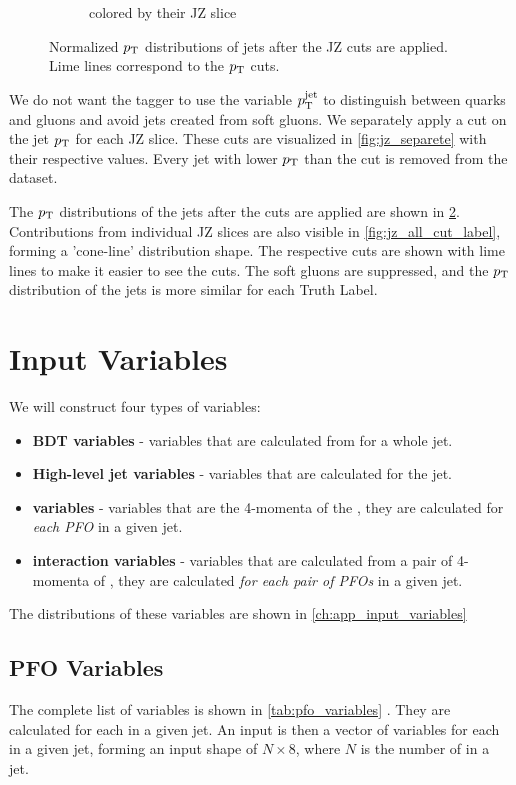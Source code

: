\begin{figure}[htb]
\begin{subfigure}[t]{0.49\textwidth}
        \caption{colored by their JZ slice}
        \label{fig:jz_all_cut_jz}
    \end{subfigure}
    \caption{Normalized $p_\text{T}$ distributions of jets after the JZ cuts are applied. Lime lines correspond to the $p_\text{T}$ cuts.}
    \label{fig:jz_all_cut}
\end{figure}
We do not want the tagger to use the variable $p_\text{T}^{\text{jet}}$ to distinguish between quarks and gluons and avoid jets created from soft gluons.
We separately apply a cut on the jet $p_\text{T}$ for each JZ slice.
These cuts are visualized in \cref{fig:jz_separete} with their respective values.
Every jet with lower $p_\text{T}$ than the cut is removed from the dataset.

The $p_\text{T}$ distributions of the jets after the cuts are applied are shown in \cref{fig:jz_all_cut}.
Contributions from individual JZ slices are also visible in \cref{fig:jz_all_cut_label}, forming a 'cone-line' distribution shape.
The respective cuts are shown with lime lines to make it easier to see the cuts.
The soft gluons are suppressed, and the $p_\text{T}$ distribution of the jets is more similar for each Truth Label. 


\FloatBarrier
\section{Input Variables}
\label{sec:input_variables}
We will construct four types of variables:
\begin{itemize}
    \item \textbf{BDT variables} - variables that are calculated from \PFOs for a whole jet.
    \item \textbf{High-level jet variables} - variables that are calculated for the jet.
    \item \textbf{\PFO variables} - variables that are  the 4-momenta of the \PFOs, they are calculated for \emph{each PFO} in a given jet.
    \item \textbf{\PFO interaction variables} - variables that are calculated from a pair of 4-momenta of \PFO, they are calculated \emph{for each pair of PFOs} in a given jet.
\end{itemize}
The distributions of these variables are shown in \cref{ch:app_input_variables}

\subsection{PFO Variables}
\label{sec:pfo_variables}

The complete list of \PFO variables is shown in \cref{tab:pfo_variables} \cite{part}.
They are calculated for each \PFO in a given jet.
An input is then a vector of \PFO variables for each \PFO in a given jet, forming an input shape of $N \times 8$, where $N$ is the number of \PFOs in a jet.

